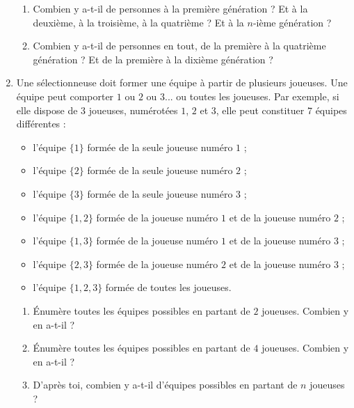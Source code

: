 \documentclass[class=report,crop=false, 12pt]{standalone}
\begin{document}
\begin{activite}
\begin{enumerate}
\begin{enumerate}
    \item Combien y a-t-il de personnes à la première génération ? Et à la deuxième, à la troisième, à la quatrième ? Et à la $n$-ième génération ?
    
    \item Combien y a-t-il de personnes en tout, de la première à la quatrième génération ?
    Et de la première à la dixième génération ?
 
  \end{enumerate}  
  
  
  \item Une sélectionneuse doit former une équipe à partir de plusieurs joueuses. Une équipe peut comporter $1$ ou $2$ ou $3$...  ou toutes les joueuses.
  Par exemple, si elle dispose de $3$ joueuses, numérotées $1$, $2$ et $3$, elle peut constituer $7$ équipes différentes :
    \begin{itemize}
      \item l'équipe $\{1\}$ formée de la seule joueuse numéro $1$ ;
      \item l'équipe $\{2\}$ formée de la seule joueuse numéro $2$ ;
      \item l'équipe $\{3\}$ formée de la seule joueuse numéro $3$ ;
      \item l'équipe $\{1,2\}$ formée de la joueuse numéro $1$ et de la joueuse numéro $2$ ;
      \item l'équipe $\{1,3\}$ formée de la joueuse numéro $1$ et de la joueuse numéro $3$ ;      
      \item l'équipe $\{2,3\}$ formée de la joueuse numéro $2$ et de la joueuse numéro $3$ ;     
      \item l'équipe $\{1,2,3\}$ formée de toutes les joueuses.    
    \end{itemize}  
  
  
  \begin{enumerate}
    \item Énumère toutes les équipes possibles en partant de $2$ joueuses. Combien y en a-t-il ?
    \item Énumère toutes les équipes possibles en partant de $4$ joueuses. Combien y en a-t-il ?
    \item D'après toi, combien y a-t-il d'équipes possibles en partant de $n$ joueuses ?
  \end{enumerate}
  
  
\end{enumerate}
\end{activite}
\end{document}
